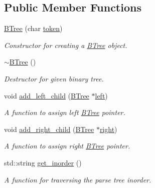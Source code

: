 \subsection*{Public Member Functions}
\begin{DoxyCompactItemize}
\item 
\mbox{\hyperlink{classBTree_a816ccfed62d3bd439b61c03f660d1cc6}{B\+Tree}} (char \mbox{\hyperlink{classBTree_a3d5016b19ab621d5c61cf633ec012a72}{token}})
\begin{DoxyCompactList}\small\item\em Constructor for creating a \mbox{\hyperlink{classBTree}{B\+Tree}} object. \end{DoxyCompactList}\item 
\mbox{\hyperlink{classBTree_a1d0dbad21ec825a7c8e5625709010e6c}{$\sim$\+B\+Tree}} ()
\begin{DoxyCompactList}\small\item\em Destructor for given binary tree. \end{DoxyCompactList}\item 
void \mbox{\hyperlink{classBTree_ae80b1f2b89c404206d76e5371c820d7a}{add\+\_\+left\+\_\+child}} (\mbox{\hyperlink{classBTree}{B\+Tree}} $\ast$\mbox{\hyperlink{classBTree_ad7e7d928a099c40fbd0d323f76d7cf18}{left}})
\begin{DoxyCompactList}\small\item\em A function to assign left \mbox{\hyperlink{classBTree}{B\+Tree}} pointer. \end{DoxyCompactList}\item 
void \mbox{\hyperlink{classBTree_a03ed2114a3f21b5f1b6b0ae93d7cdc91}{add\+\_\+right\+\_\+child}} (\mbox{\hyperlink{classBTree}{B\+Tree}} $\ast$\mbox{\hyperlink{classBTree_af95770a535a9278b37fd73d7b6ae7f5e}{right}})
\begin{DoxyCompactList}\small\item\em A function to assign right \mbox{\hyperlink{classBTree}{B\+Tree}} pointer. \end{DoxyCompactList}\item 
std\+::string \mbox{\hyperlink{classBTree_a408f4bcf02423637c7132bcc44646f01}{get\+\_\+inorder}} ()
\begin{DoxyCompactList}\small\item\em A function for traversing the parse tree inorder. \end{DoxyCompactList}\end{DoxyCompactItemize}
